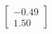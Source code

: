 \documentclass[preview]{standalone}
\begin{document}
\begin{align*}
\begin{bmatrix} -0.49 \\ 1.50 \end{bmatrix}
\end{align*}
\end{document}
